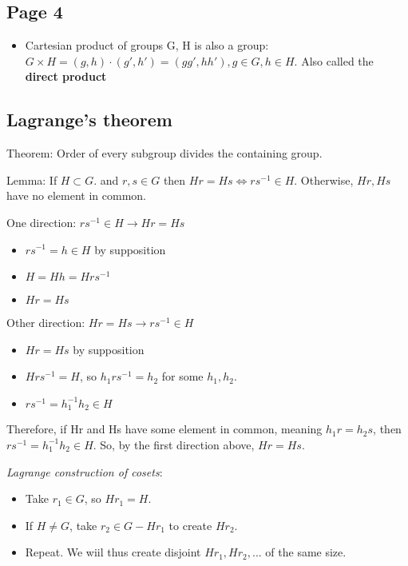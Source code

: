 \documentclass[11pt, oneside]{article}   	%
\begin{document}
\subsection {Page 4}

\begin{itemize}
\item Cartesian product of groups G, H is also a group: $G \times H = (g, h) \cdot (g', h') = (gg', hh'), g \in G, h \in H$.  Also called the \textbf{direct product}
\end{itemize}

\subsection {Lagrange's theorem}

Theorem: Order of every subgroup divides the containing group.

Lemma: If $H \subset G.  $ and $r,s \in G $ then $Hr = Hs \iff rs^{-1} \in H$.  Otherwise, $Hr, Hs$ have no element in common.

One direction: $rs^{-1} \in H \rightarrow Hr=Hs$
\begin{itemize} 
\item $rs^{-1}  = h \in H$ by supposition
\item $H = Hh = Hrs^{-1}$
\item $Hr = Hs$
\end{itemize}

Other direction: $ Hr=Hs \rightarrow rs^{-1} \in H$
\begin{itemize} 
\item $Hr = Hs$ by supposition
\item $Hrs^{-1} = H$, so $h_1rs^{-1} = h_2$ for some $h_1, h_2$.
\item $rs^{-1} = h_1^{-1}h_2 \in H$
\end{itemize}

Therefore, if Hr and Hs have some element in common, meaning $h_1r=h_2s$, then $rs^{-1} = h_1^{-1}h_2 \in H$.  
So, by the first direction above, $Hr = Hs$.

\emph{Lagrange construction of cosets}:
\begin{itemize}
\item Take $r_1 \in G$, so $Hr_1 = H$.  
\item If $H \neq G$, take $r_2 \in G - Hr_1$ to create $Hr_2$.
\item Repeat.  We wiil thus create disjoint $Hr_1, Hr_2, ... $ of the same size.  
\end{itemize}
\end{document}
